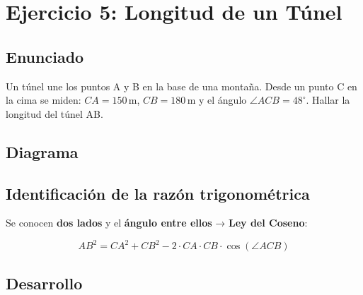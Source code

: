\documentclass[11pt, letterpaper]{article}
\begin{document}
\newpage
\section{Ejercicio 5: Longitud de un Túnel}

\subsection*{Enunciado}
Un túnel une los puntos A y B en la base de una montaña. Desde un punto C en la
cima se miden: \(CA = 150\,\text{m}\), \(CB = 180\,\text{m}\) y el ángulo
\(\angle ACB = 48^\circ\). Hallar la longitud del túnel AB.

\subsection*{Diagrama}

\begin{center}
\end{center}

\subsection*{Identificación de la razón trigonométrica}

Se conocen \textbf{dos lados} y el \textbf{ángulo entre ellos} → \textbf{Ley del Coseno}:

\begin{formulabox}
\[
  AB^2 = CA^2 + CB^2 - 2\cdot CA\cdot CB\cdot\cos(\angle ACB)
\]
\end{formulabox}

\subsection*{Desarrollo}
\end{document}
